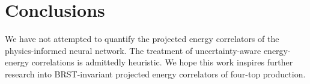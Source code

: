 \section{Conclusions}\label{sec:conclusions}

We have not attempted to quantify the projected energy correlators of
the physics-informed neural network. The treatment of uncertainty-aware
energy-energy correlations is admittedly heuristic. We hope this work
inspires further research into BRST-invariant projected energy
correlators of four-top production.

